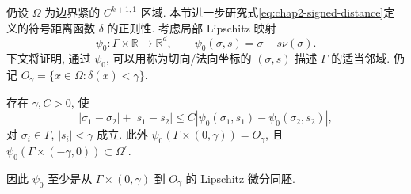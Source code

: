 仍设 $\Omega$ 为边界紧的 $C^{k+1,1}$ 区域. 本节进一步研究式\eqref{eq:chap2-signed-distance}定义的符号距离函数 $\delta$ 的正则性. 考虑局部 Lipschitz 映射
\[
 \psi_0:\Gamma\times\mathbb R\longrightarrow\mathbb R^d,
 \qquad\psi_0(\sigma,s)=\sigma-s\nu(\sigma).
\]
下文将证明, 通过 $\psi_0$, 可以用称为切向/法向坐标的 $(\sigma,s)$ 描述 $\Gamma$ 的适当邻域. 仍记 $O_\gamma=\{x\in\Omega:\delta(x)<\gamma\}$.

\begin{Theorem}
\label{thm:chap3-tubular-neighborhood}
存在 $\gamma,C>0$, 使
\begin{equation}
 |\sigma_1-\sigma_2|+|s_1-s_2|
 \leq C|\psi_0(\sigma_1,s_1)-\psi_0(\sigma_2,s_2)|,
 \label{eq:chap3-tubular-bi-lipschitz}
\end{equation}
对 $\sigma_i\in\Gamma$, $|s_i|<\gamma$ 成立. 此外 $\psi_0(\Gamma\times(0,\gamma))=O_\gamma$, 且 $\psi_0(\Gamma\times(-\gamma,0))\subset\Omega^c$.
\end{Theorem}

因此 $\psi_0$ 至少是从 $\Gamma\times(0,\gamma)$ 到 $O_\gamma$ 的 Lipschitz 微分同胚.


